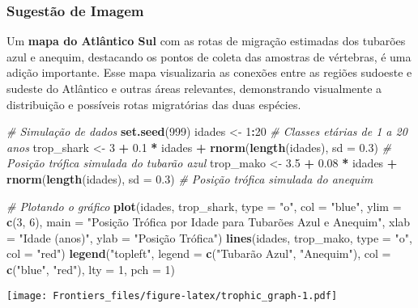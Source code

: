 \documentclass[
  utf8]{FrontiersinHarvard}
\newenvironment{Shaded}{\begin{snugshade}}{\end{snugshade}}
\newcommand{\AttributeTok}[1]{\textcolor[rgb]{0.13,0.29,0.53}{#1}}
\newcommand{\CommentTok}[1]{\textcolor[rgb]{0.56,0.35,0.01}{\textit{#1}}}
\newcommand{\DecValTok}[1]{\textcolor[rgb]{0.00,0.00,0.81}{#1}}
\newcommand{\FloatTok}[1]{\textcolor[rgb]{0.00,0.00,0.81}{#1}}
\newcommand{\FunctionTok}[1]{\textcolor[rgb]{0.13,0.29,0.53}{\textbf{#1}}}
\newcommand{\NormalTok}[1]{#1}
\newcommand{\OtherTok}[1]{\textcolor[rgb]{0.56,0.35,0.01}{#1}}
\newcommand{\SpecialCharTok}[1]{\textcolor[rgb]{0.81,0.36,0.00}{\textbf{#1}}}
\newcommand{\StringTok}[1]{\textcolor[rgb]{0.31,0.60,0.02}{#1}}
\begin{document}
\subsubsection*{Sugestão de Imagem}\label{sugestuxe3o-de-imagem}

Um \textbf{mapa do Atlântico Sul} com as rotas de migração estimadas dos
tubarões azul e anequim, destacando os pontos de coleta das amostras de
vértebras, é uma adição importante. Esse mapa visualizaria as conexões
entre as regiões sudoeste e sudeste do Atlântico e outras áreas
relevantes, demonstrando visualmente a distribuição e possíveis rotas
migratórias das duas espécies.

\begin{Shaded}
\begin{Highlighting}[]
\CommentTok{\# Simulação de dados}
\FunctionTok{set.seed}\NormalTok{(}\DecValTok{999}\NormalTok{)}
\NormalTok{idades }\OtherTok{\textless{}{-}} \DecValTok{1}\SpecialCharTok{:}\DecValTok{20}  \CommentTok{\# Classes etárias de 1 a 20 anos}
\NormalTok{trop\_shark }\OtherTok{\textless{}{-}} \DecValTok{3} \SpecialCharTok{+} \FloatTok{0.1} \SpecialCharTok{*}\NormalTok{ idades }\SpecialCharTok{+} \FunctionTok{rnorm}\NormalTok{(}\FunctionTok{length}\NormalTok{(idades), }\AttributeTok{sd =} \FloatTok{0.3}\NormalTok{)  }\CommentTok{\# Posição trófica simulada do tubarão azul}
\NormalTok{trop\_mako }\OtherTok{\textless{}{-}} \FloatTok{3.5} \SpecialCharTok{+} \FloatTok{0.08} \SpecialCharTok{*}\NormalTok{ idades }\SpecialCharTok{+} \FunctionTok{rnorm}\NormalTok{(}\FunctionTok{length}\NormalTok{(idades), }\AttributeTok{sd =} \FloatTok{0.3}\NormalTok{)  }\CommentTok{\# Posição trófica simulada do anequim}

\CommentTok{\# Plotando o gráfico}
\FunctionTok{plot}\NormalTok{(idades, trop\_shark, }\AttributeTok{type =} \StringTok{"o"}\NormalTok{, }\AttributeTok{col =} \StringTok{"blue"}\NormalTok{, }\AttributeTok{ylim =} \FunctionTok{c}\NormalTok{(}\DecValTok{3}\NormalTok{, }\DecValTok{6}\NormalTok{),}
     \AttributeTok{main =} \StringTok{"Posição Trófica por Idade para Tubarões Azul e Anequim"}\NormalTok{,}
     \AttributeTok{xlab =} \StringTok{"Idade (anos)"}\NormalTok{, }\AttributeTok{ylab =} \StringTok{"Posição Trófica"}\NormalTok{)}
\FunctionTok{lines}\NormalTok{(idades, trop\_mako, }\AttributeTok{type =} \StringTok{"o"}\NormalTok{, }\AttributeTok{col =} \StringTok{"red"}\NormalTok{)}
\FunctionTok{legend}\NormalTok{(}\StringTok{"topleft"}\NormalTok{, }\AttributeTok{legend =} \FunctionTok{c}\NormalTok{(}\StringTok{"Tubarão Azul"}\NormalTok{, }\StringTok{"Anequim"}\NormalTok{), }\AttributeTok{col =} \FunctionTok{c}\NormalTok{(}\StringTok{"blue"}\NormalTok{, }\StringTok{"red"}\NormalTok{), }\AttributeTok{lty =} \DecValTok{1}\NormalTok{, }\AttributeTok{pch =} \DecValTok{1}\NormalTok{)}
\end{Highlighting}
\end{Shaded}

\texttt{[image: Frontiers\_files/figure-latex/trophic\_graph-1.pdf]}
\end{document}
